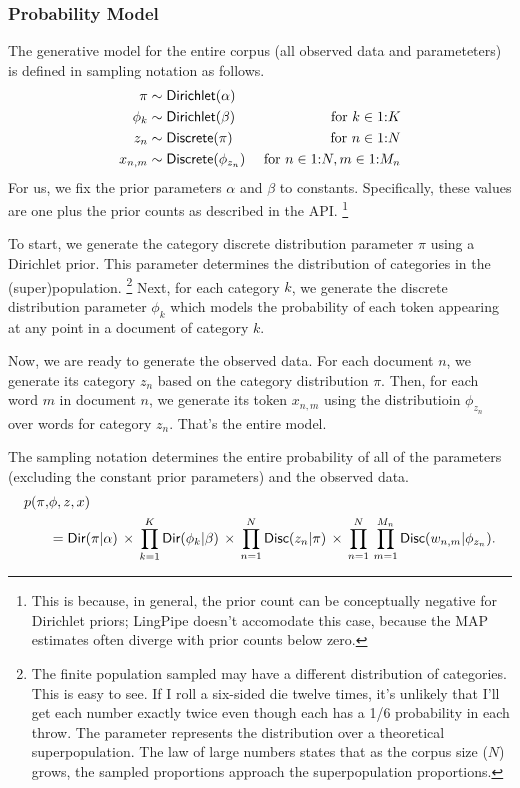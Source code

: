 \subsubsection{Probability Model}

The generative model for the entire corpus (all observed data and
parameteters) is defined in sampling notation as follows.
%
\begin{align}
\pi &\sim \mbox{\sf Dirichlet}(\alpha)
\\
\phi_{k} &\sim \mbox{\sf Dirichlet}(\beta)
& \mbox{ for } k \in 1{:}K
\\
z_n &\sim \mbox{\sf Discrete}(\pi) & \mbox{ for } n \in 1{:}N
\\
x_{n,m} &\sim \mbox{\sf Discrete}(\phi_{z_n}) & \mbox{ for } n \in 1{:}N, m \in 1{:}M_n
\end{align}
%
For us, we fix the prior parameters $\alpha$ and $\beta$ to constants.
Specifically, these values are one plus the prior counts as described
in the API.%
%
\footnote{This is because, in general, the prior count can be
  conceptually negative for Dirichlet priors; LingPipe doesn't
  accomodate this case, because the MAP estimates often diverge with
  prior counts below zero.}
%

To start, we generate the category discrete distribution parameter
$\pi$ using a Dirichlet prior.  This parameter determines the
distribution of categories in the (super)population.%
%
\footnote{The finite population sampled may have a different
  distribution of categories.  This is easy to see.  If I roll a
  six-sided die twelve times, it's unlikely that I'll get each number
  exactly twice even though each has a 1/6 probability in each throw.
  The parameter represents the distribution over a theoretical
  superpopulation.  The law of large numbers states that as the corpus
  size ($N$) grows, the sampled proportions approach the
  superpopulation proportions.}
%
Next, for each category $k$, we generate the discrete distribution
parameter $\phi_k$ which models the probability of each token
appearing at any point in a document of category $k$.  

Now, we are ready to generate the observed data.  For each document
$n$, we generate its category $z_n$ based on the category distribution
$\pi$.  Then, for each word $m$ in document $n$, we generate its token
$x_{n,m}$ using the distributioin $\phi_{z_n}$ over words for category
$z_n$.  That's the entire model.

The sampling notation determines the entire probability of all of the
parameters (excluding the constant prior parameters) and the observed
data.
%
\begin{align}
p(\pi,&\phi,z,x) 
\\
&{} = \mbox{\sf Dir}(\pi|\alpha)
\, \times \,  \prod_{k=1}^K \mbox{\sf Dir}(\phi_k|\beta)
\, \times \,  \prod_{n=1}^N \mbox{\sf Disc}(z_n|\pi)
\, \times \,  \prod_{n=1}^N \, \prod_{m=1}^{M_n} \mbox{\sf Disc}(w_{n,m}|\phi_{z_n}).
\nonumber
\end{align}


